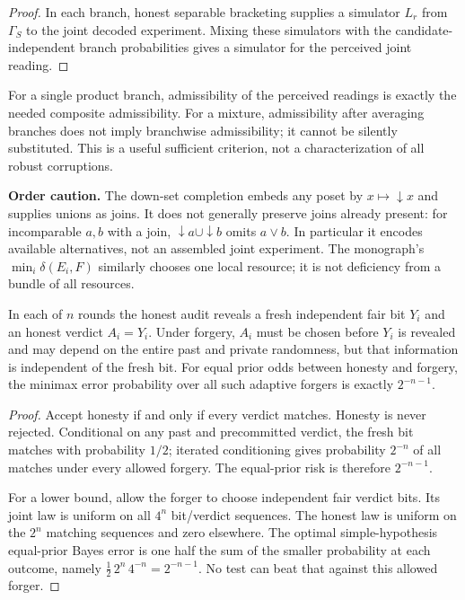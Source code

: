 \begin{proof}

In each branch, honest separable bracketing supplies a simulator \(L_r\) from \(\Gamma_S\) to the joint decoded experiment. Mixing these simulators with the candidate-independent branch probabilities gives a simulator for the perceived joint reading.
\end{proof}

For a single product branch, admissibility of the perceived readings is exactly the needed composite admissibility. For a mixture, admissibility after averaging branches does not imply branchwise admissibility; it cannot be silently substituted. This is a useful sufficient criterion, not a characterization of all robust corruptions.

\textbf{Order caution.} The down-set completion embeds any poset by \(x\mapsto{\downarrow}x\) and supplies unions as joins. It does not generally preserve joins already present: for incomparable \(a,b\) with a join, \({\downarrow}a\cup{\downarrow}b\) omits \(a\vee b\). In particular it encodes available alternatives, not an assembled joint experiment. The monograph's \(\min_i\delta(E_i,F)\) similarly chooses one local resource; it is not deficiency from a bundle of all resources.


\begin{thmplain}

In each of \(n\) rounds the honest audit reveals a fresh independent fair bit \(Y_i\) and an honest verdict \(A_i=Y_i\). Under forgery, \(A_i\) must be chosen before \(Y_i\) is revealed and may depend on the entire past and private randomness, but that information is independent of the fresh bit. For equal prior odds between honesty and forgery, the minimax error probability over all such adaptive forgers is exactly \(2^{-n-1}\).
\end{thmplain}

\begin{proof}

Accept honesty if and only if every verdict matches. Honesty is never rejected. Conditional on any past and precommitted verdict, the fresh bit matches with probability \(1/2\); iterated conditioning gives probability \(2^{-n}\) of all matches under every allowed forgery. The equal-prior risk is therefore \(2^{-n-1}\).

For a lower bound, allow the forger to choose independent fair verdict bits. Its joint law is uniform on all \(4^n\) bit/verdict sequences. The honest law is uniform on the \(2^n\) matching sequences and zero elsewhere. The optimal simple-hypothesis equal-prior Bayes error is one half the sum of the smaller probability at each outcome, namely \(\tfrac12\,2^n\,4^{-n}=2^{-n-1}\). No test can beat that against this allowed forger.
\end{proof}

